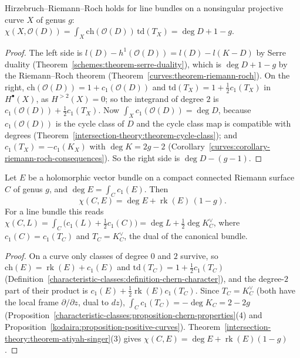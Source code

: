 \begin{proposition}\label{intersection-theory:proposition-rr-curves}
Hirzebruch--Riemann--Roch holds for line bundles on a nonsingular projective curve $X$ of genus $g$: $\chi(X, \mathcal{O}(D)) = \int_X\mathrm{ch}(\mathcal{O}(D))\,\mathrm{td}(T_X) = \deg D + 1 - g$.
\end{proposition}

\begin{proof}
The left side is $l(D) - h^1(\mathcal{O}(D)) = l(D) - l(K - D)$ by Serre duality (Theorem~\ref{schemes:theorem-serre-duality}), which is $\deg D + 1 - g$ by the Riemann--Roch theorem
(Theorem~\ref{curves:theorem-riemann-roch}). On the right, $\mathrm{ch}(\mathcal{O}(D)) = 1 + c_1(\mathcal{O}(D))$ and $\mathrm{td}(T_X) = 1 + \frac12c_1(T_X)$ in $H^\bullet(X)$, as $H^{>2}(X) = 0$; so the integrand of degree $2$ is
$c_1(\mathcal{O}(D)) + \frac12c_1(T_X)$. Now $\int_Xc_1(\mathcal{O}(D)) = \deg D$, because $c_1(\mathcal{O}(D))$ is the cycle class of $D$ and the cycle class map is compatible with degrees
(Theorem~\ref{intersection-theory:theorem-cycle-class}); and $c_1(T_X) = -c_1(K_X)$ with $\deg K = 2g - 2$ (Corollary~\ref{curves:corollary-riemann-roch-consequences}). So the right side is $\deg D - (g - 1)$.
\end{proof}

\begin{corollary}\label{intersection-theory:corollary-rr-bundles-curves}
Let $E$ be a holomorphic vector bundle on a compact connected Riemann surface $C$ of genus $g$, and $\deg E = \int_Cc_1(E)$. Then
\[
\chi(C, E) = \deg E + \operatorname{rk}(E)\,(1 - g) .
\]
For a line bundle this reads $\chi(C, L) = \int_C\big(c_1(L) + \frac12c_1(C)\big) = \deg L + \frac12\deg K_C^\vee$, where $c_1(C) = c_1(T_C)$ and $T_C = K_C^\vee$, the dual of the canonical bundle.
\end{corollary}

\begin{proof}
On a curve only classes of degree $0$ and $2$ survive, so $\mathrm{ch}(E) = \operatorname{rk}(E) + c_1(E)$ and $\mathrm{td}(T_C) = 1 + \frac12c_1(T_C)$ (Definition~\ref{characteristic-classes:definition-chern-character}), and the degree-$2$ part of their
product is $c_1(E) + \frac12\operatorname{rk}(E)c_1(T_C)$. Since $T_C = K_C^\vee$ (both have the local frame $\partial/\partial z$, dual to $dz$), $\int_Cc_1(T_C) = -\deg K_C = 2 - 2g$
(Proposition~\ref{characteristic-classes:proposition-chern-properties}(4) and Proposition~\ref{kodaira:proposition-positive-curves}). Theorem~\ref{intersection-theory:theorem-atiyah-singer}(3) gives
$\chi(C, E) = \deg E + \operatorname{rk}(E)(1 - g)$.
\end{proof}

